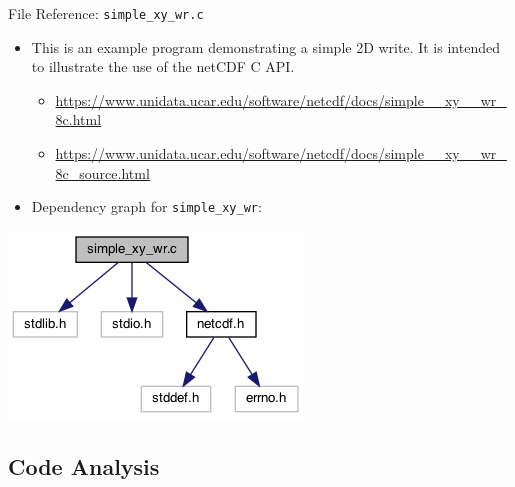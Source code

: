 \documentclass[compress,11pt,xcolor=svgnames,aspectratio=169]{beamer}
\begin{document}
\begin{frame}[fragile]{File Reference: \texttt{simple\_xy\_wr.c}}

\begin{itemize}

  \item This is an example program demonstrating a simple 2D write. It is intended to illustrate the use of the netCDF C API.\\[0.3cm]

    \begin{itemize}
      \item {\tiny \url{https://www.unidata.ucar.edu/software/netcdf/docs/simple__xy__wr_8c.html}}\\[0.3cm]
      \item {\tiny \url{https://www.unidata.ucar.edu/software/netcdf/docs/simple__xy__wr_8c_source.html}}\\[0.4cm]
    \end{itemize}

  \item Dependency graph for \verb|simple_xy_wr|:

\end{itemize}

\begin{center}
\includegraphics[scale=0.5]{fig/simple__xy__wr_8c__incl}
\end{center}

\end{frame}

\subsection{Code Analysis}
\end{document}
